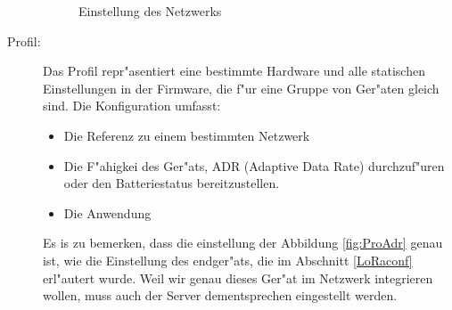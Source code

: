 \begin{description}
	\begin{figure}[h!]
		\centering
		\caption{Einstellung des Netzwerks}
	\end{figure}

	\item[Profil:] Das Profil repr"asentiert eine bestimmte Hardware und alle statischen Einstellungen in der Firmware, die f"ur eine Gruppe von Ger"aten gleich sind. Die Konfiguration umfasst:
	\begin{itemize}
		\item Die Referenz zu einem bestimmten Netzwerk
		\item Die F"ahigkei des Ger"ats, ADR (Adaptive Data Rate) durchzuf"uren oder den Batteriestatus bereitzustellen.
		\item Die Anwendung
	\end{itemize} 
	Es is zu bemerken, dass die einstellung der Abbildung \ref{fig:ProAdr} genau ist, wie die Einstellung des endger"ats, die im Abschnitt \ref{LoRaconf} erl"autert wurde. Weil wir genau dieses Ger"at im Netzwerk integrieren wollen, muss auch der Server dementsprechen eingestellt werden.


\end{description}
